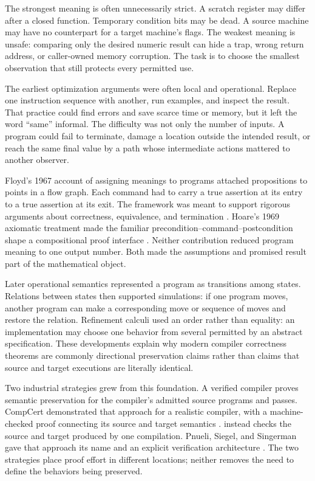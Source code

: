 The strongest meaning is often unnecessarily strict. A scratch register may
differ after a closed function. Temporary condition bits may be dead. A source
machine may have no counterpart for a target machine's flags. The weakest
meaning is unsafe: comparing only the desired numeric result can hide a trap,
wrong return address, or caller-owned memory corruption. The task is to choose
the smallest observation that still protects every permitted use.

The earliest optimization arguments were often local and operational. Replace
one instruction sequence with another, run examples, and inspect the result.
That practice could find errors and save scarce time or memory, but it left the
word ``same'' informal. The difficulty was not only the number of inputs. A
program could fail to terminate, damage a location outside the intended
result, or reach the same final value by a path whose intermediate actions
mattered to another observer.

Floyd's 1967 account of assigning meanings to programs attached propositions
to points in a flow graph. Each command had to carry a true assertion at its
entry to a true assertion at its exit. The framework was meant to support
rigorous arguments about correctness, equivalence, and termination
\autocite{floyd1967meanings}. Hoare's 1969 axiomatic treatment made the familiar
precondition--command--postcondition shape a compositional proof interface
\autocite{hoare1969axiomatic}. Neither contribution reduced program meaning to
one output number. Both made the assumptions and promised result part of the
mathematical object.

Later operational semantics represented a program as transitions among
states. Relations between states then supported simulations: if one program
moves, another program can make a corresponding move or sequence of moves and
restore the relation. Refinement calculi used an order rather than equality:
an implementation may choose one behavior from several permitted by an
abstract specification. These developments explain why modern compiler
correctness theorems are commonly directional preservation claims rather than
claims that source and target executions are literally identical.

Two industrial strategies grew from this foundation. A verified compiler
proves semantic preservation for the compiler's admitted source programs and
passes. CompCert demonstrated that approach for a realistic compiler, with a
machine-checked proof connecting its source and target semantics
\autocite{leroy2009compcert}.  instead checks
the source and target produced by one compilation. Pnueli, Siegel, and
Singerman gave that approach its name and an explicit verification architecture
\autocite{pnueli1998translation}. The two strategies place proof effort in
different locations; neither removes the need to define the behaviors being
preserved.

